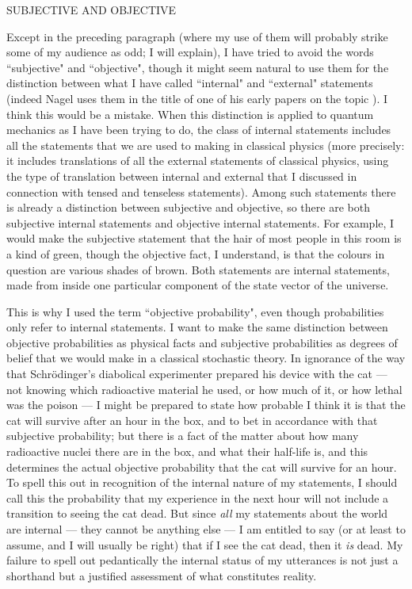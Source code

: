 \documentclass[12pt,a4paper,reqno]{article}
\renewcommand{\(}{\left(}
\renewcommand{\)}{\right)}
\newcommand{\<}{\langle}
\renewcommand{\>}{\rangle}
\theoremstyle{plain} %
\theoremstyle{definition}
\theoremstyle{remark}
\begin{document}
\medskip
\begin{center}
SUBJECTIVE AND OBJECTIVE
\end{center}

Except in the preceding paragraph (where my use of them will probably
strike some of my audience as odd; I will explain), I have tried to
avoid the words ``subjective" and ``objective", though it might seem
natural to use them for the distinction between what I have called
``internal" and ``external" statements (indeed Nagel uses them in
the title of one of his early papers on the topic \cite{Nagel:subjobj}).
I think this would be a mistake. When this distinction is applied to quantum
mechanics as I have been trying to do, the class of internal statements
includes all the statements that we are used to making in classical
physics (more precisely: it includes translations of all the external
statements of classical physics, using the type of translation between
internal and external that I discussed in connection with tensed and
tenseless statements). Among such statements there is already a
distinction between subjective and objective, so there are both
subjective internal statements and objective internal statements. For
example, I would make the subjective statement that the hair of most people in
this room is a kind of green, though the objective fact, I
understand, is that the colours in question are various shades of brown.
Both statements are internal statements, made from inside one particular
component of the state vector of the universe.

This is why I used the term ``objective probability", even though
probabilities only refer to internal statements. I want to make the same
distinction between objective probabilities as physical facts and
subjective probabilities as degrees of belief that we would make in a
classical stochastic theory. In ignorance of the way that
Schr\"odinger's diabolical experimenter prepared his device with the cat
--- not knowing which radioactive material he used, or how much of it,
or how lethal was the poison --- I might be prepared to state how
probable I think it is that the cat will survive after an hour in the
box, and to bet in accordance with that subjective probability; but
there is a fact of the matter about how many radioactive nuclei there
are in the box, and what their half-life is, and this determines the
actual objective probability that the cat will survive for an hour. To
spell this out in recognition of the internal nature of my statements, I
should call this the probability that my experience in the next hour
will not include a transition to seeing the cat dead. But since
\emph{all} my statements about the world are internal --- they cannot be
anything else --- I am entitled to say (or at least to assume, and I
will usually be right) that if I see the cat dead, then it \emph{is}
dead. My failure to spell out pedantically the internal status of my
utterances is not just a shorthand but a justified assessment of what
constitutes reality.
\end{document}
